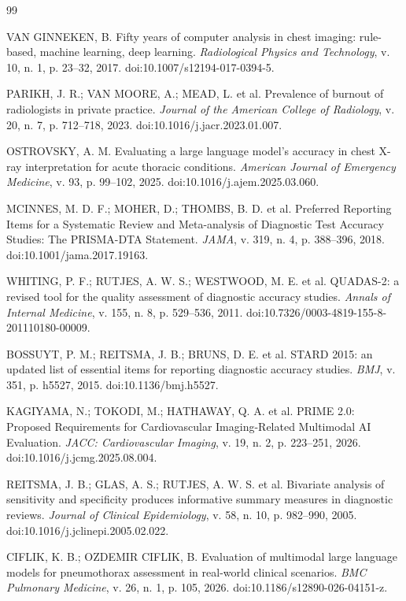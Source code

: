 \documentclass[12pt,a4paper]{article}
\begin{document}
\newpage
\begin{singlespace}
\begin{thebibliography}{99}

 VAN GINNEKEN, B. Fifty years of computer analysis in chest imaging: rule-based, machine learning, deep learning. \textit{Radiological Physics and Technology}, v. 10, n. 1, p. 23--32, 2017. doi:10.1007/s12194-017-0394-5.

 PARIKH, J. R.; VAN MOORE, A.; MEAD, L. et al. Prevalence of burnout of radiologists in private practice. \textit{Journal of the American College of Radiology}, v. 20, n. 7, p. 712--718, 2023. doi:10.1016/j.jacr.2023.01.007.

 OSTROVSKY, A. M. Evaluating a large language model's accuracy in chest X-ray interpretation for acute thoracic conditions. \textit{American Journal of Emergency Medicine}, v. 93, p. 99--102, 2025. doi:10.1016/j.ajem.2025.03.060.

 MCINNES, M. D. F.; MOHER, D.; THOMBS, B. D. et al. Preferred Reporting Items for a Systematic Review and Meta-analysis of Diagnostic Test Accuracy Studies: The PRISMA-DTA Statement. \textit{JAMA}, v. 319, n. 4, p. 388--396, 2018. doi:10.1001/jama.2017.19163.

 WHITING, P. F.; RUTJES, A. W. S.; WESTWOOD, M. E. et al. QUADAS-2: a revised tool for the quality assessment of diagnostic accuracy studies. \textit{Annals of Internal Medicine}, v. 155, n. 8, p. 529--536, 2011. doi:10.7326/0003-4819-155-8-201110180-00009.

 BOSSUYT, P. M.; REITSMA, J. B.; BRUNS, D. E. et al. STARD 2015: an updated list of essential items for reporting diagnostic accuracy studies. \textit{BMJ}, v. 351, p. h5527, 2015. doi:10.1136/bmj.h5527.

 KAGIYAMA, N.; TOKODI, M.; HATHAWAY, Q. A. et al. PRIME 2.0: Proposed Requirements for Cardiovascular Imaging-Related Multimodal AI Evaluation. \textit{JACC: Cardiovascular Imaging}, v. 19, n. 2, p. 223--251, 2026. doi:10.1016/j.jcmg.2025.08.004.

 REITSMA, J. B.; GLAS, A. S.; RUTJES, A. W. S. et al. Bivariate analysis of sensitivity and specificity produces informative summary measures in diagnostic reviews. \textit{Journal of Clinical Epidemiology}, v. 58, n. 10, p. 982--990, 2005. doi:10.1016/j.jclinepi.2005.02.022.

 CIFLIK, K. B.; OZDEMIR CIFLIK, B. Evaluation of multimodal large language models for pneumothorax assessment in real-world clinical scenarios. \textit{BMC Pulmonary Medicine}, v. 26, n. 1, p. 105, 2026. doi:10.1186/s12890-026-04151-z.


\end{thebibliography}
\end{singlespace}
\end{document}
